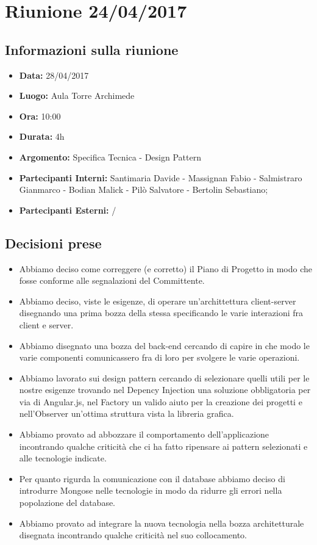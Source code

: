 \section{Riunione 24/04/2017}
  \subsection{Informazioni sulla riunione}
    \begin{itemize}
      \item \textbf{Data: }28/04/2017
      \item \textbf{Luogo: }Aula Torre Archimede
      \item \textbf{Ora: }10:00
      \item \textbf{Durata: }4h
      \item \textbf{Argomento: }Specifica Tecnica - Design Pattern
      \item \textbf{Partecipanti Interni: }Santimaria Davide - Massignan Fabio - Salmistraro Gianmarco - Bodian Malick - Pilò Salvatore - Bertolin Sebastiano;
      \item \textbf{Partecipanti Esterni: }/
    \end{itemize}
  \subsection{Decisioni prese}
		\begin{itemize}
			\item Abbiamo deciso come correggere (e corretto) il Piano di Progetto in modo che fosse conforme alle segnalazioni del Committente.
      \item Abbiamo deciso, viste le esigenze, di operare un'archittettura client-server disegnando una prima bozza della stessa specificando le varie interazioni
        fra client e server.
      \item Abbiamo disegnato una bozza del back-end cercando di capire in che modo le varie componenti comunicassero fra di loro per svolgere le varie operazioni.
      \item Abbiamo lavorato sui design pattern cercando di selezionare quelli utili per le nostre esigenze trovando nel Depency Injection una soluzione obbligatoria
        per via di Angular.js, nel Factory un valido aiuto per la creazione dei progetti e nell'Observer un'ottima struttura vista la libreria grafica.
      \item Abbiamo provato ad abbozzare il comportamento dell'applicazione incontrando qualche criticità che ci ha fatto ripensare ai pattern selezionati e alle tecnologie
        indicate.
      \item Per quanto rigurda la comunicazione con il database abbiamo deciso di introdurre Mongose nelle tecnologie in modo da ridurre gli errori nella popolazione del
        database.
      \item Abbiamo provato ad integrare la nuova tecnologia nella bozza architetturale disegnata incontrando qualche criticità nel suo collocamento.
		\end{itemize}
